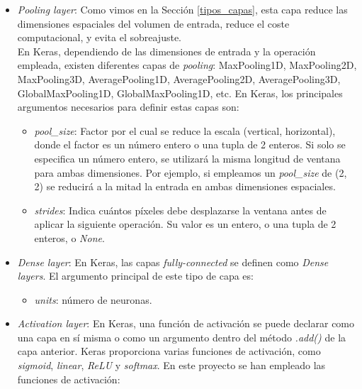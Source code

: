 \begin{itemize}
    \item \textit{Pooling layer}: Como vimos en la Sección \ref{tipos_capas}, esta capa reduce las dimensiones espaciales del volumen de entrada, reduce el coste computacional, y evita el sobreajuste.\\
    
    En Keras, dependiendo de las dimensiones de entrada y la operación empleada, existen diferentes capas de \textit{pooling}: MaxPooling1D, MaxPooling2D, MaxPooling3D, AveragePooling1D, AveragePooling2D, AveragePooling3D, GlobalMaxPooling1D, GlobalMaxPooling1D, etc. En Keras, los principales argumentos necesarios para definir estas capas son:
    
    \begin{itemize}
        \item \textit{pool\_size}: Factor por el cual se reduce la escala (vertical, horizontal), donde el factor es un número entero o una tupla de 2 enteros. Si solo se especifica un número entero, se utilizará la misma longitud de ventana para ambas dimensiones. Por ejemplo, si empleamos un \textit{pool\_size} de (2, 2) se reducirá a la mitad la entrada en ambas dimensiones espaciales.
        
        \item \textit{strides}: Indica cuántos píxeles debe desplazarse la ventana antes de aplicar la siguiente operación. Su valor es un entero, o una tupla de 2 enteros, o \textit{None}.

    \end{itemize}
    
    \item \textit{Dense layer}: En Keras, las capas \textit{fully-connected} se definen como \textit{Dense layers}. El argumento principal de este tipo de capa es:
    
        \begin{itemize}
            \item \textit{units}: número de neuronas.
        \end{itemize}
    
    \item \textit{Activation layer}: En Keras, una función de activación se puede declarar como una capa en sí misma o como un argumento dentro del método \textit{.add()} de la capa anterior. Keras proporciona varias funciones de activación, como \textit{sigmoid}, \textit{linear}, \textit{ReLU} y \textit{softmax}. En este proyecto se han empleado las funciones de activación:
    

\end{itemize}
